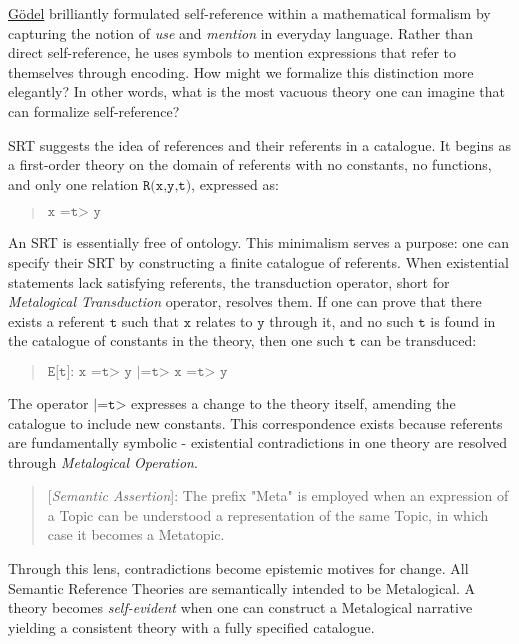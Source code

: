 \documentclass[runningheads]{llncs}
\begin{document}
\href{https://dna-platform.github.io/inexplicable-phenomena/articles/a-novel-perspective/a-novel-perspective.html}{Gödel}\xspace brilliantly formulated self-reference within a mathematical formalism by capturing the notion of \emph{use} and \emph{mention} in everyday language\cite{Quine1940}. Rather than direct self-reference, he uses symbols to mention expressions that refer to themselves through encoding. How might we formalize this distinction more elegantly? In other words, what is the most vacuous theory one can imagine that can formalize self-reference?

SRT suggests the idea of references and their referents in a catalogue. It begins as a first-order theory on the domain of referents with no constants, no functions, and only one relation $\texttt{R(x,y,t)}$, expressed as:

\begin{quote}
$\texttt{x =t> y}$
\end{quote}

An SRT is essentially free of ontology. This minimalism serves a purpose: one can specify their SRT by constructing a finite catalogue of referents. When existential statements lack satisfying referents, the transduction operator, short for \emph{Metalogical Transduction} operator, resolves them. If one can prove that there exists a referent $\texttt{t}$ such that $\texttt{x}$ relates to $\texttt{y}$ through it, and no such $\texttt{t}$ is found in the catalogue of constants in the theory, then one such $\texttt{t}$ can be transduced:

\begin{quote}
$\texttt{E[t]: x =t> y |=t> x =t> y}$
\end{quote}

The operator $\texttt{|=t>}$ expresses a change to the theory itself, amending the catalogue to include new constants. This correspondence exists because referents are fundamentally symbolic - existential contradictions in one theory are resolved through \emph{Metalogical Operation}.

\begin{quote}
[\emph{Semantic Assertion}]: The prefix "Meta" is employed when an expression of a {Topic} can be understood a representation of the same {Topic}, in which case it becomes a Meta{topic}.
\end{quote}

Through this lens, contradictions become epistemic motives for change. All Semantic Reference Theories are semantically intended to be Metalogical. A theory becomes \emph{self-evident} when one can construct a Metalogical narrative yielding a consistent theory with a fully specified catalogue.
\end{document}
